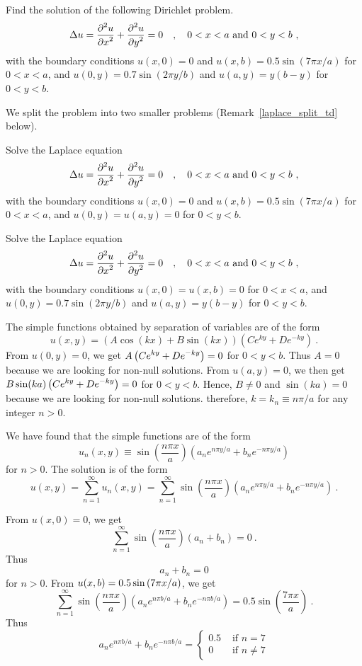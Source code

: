 \begin{egg}
Find the solution of the following Dirichlet problem.
\label{laplace_split_egg}
\[
\Delta u = \pdydxn{u}{x}{2} + \pdydxn{u}{y}{2} = 0
\quad , \quad 0 < x < a \ \text{and} \ 0 < y < b \ ,
\]
with the boundary conditions
$u(x,0) = 0$ and $u(x,b) = 0.5\sin\left(7\pi x/a\right)$ for
$0<x<a$, and $u(0,y) = 0.7 \sin\left(2\pi y/b\right)$ and
$u(a,y) = y(b-y)$ for $0<y<b$.

We split the problem into two smaller problems
(Remark~\ref{laplace_split_td} below).

Solve the Laplace equation
\[
\Delta u = \pdydxn{u}{x}{2} + \pdydxn{u}{y}{2} = 0
\quad , \quad 0 < x < a \ \text{and} \ 0 < y < b \ ,
\]
with the boundary conditions $u(x,0) = 0$ and
$u(x,b) = 0.5\sin\left(7\pi x/a\right)$ for $0<x<a$, and
$u(0,y) = u(a,y) = 0$ for $0<y<b$.

Solve the Laplace equation
\[
\Delta u = \pdydxn{u}{x}{2} + \pdydxn{u}{y}{2} = 0
\quad , \quad 0 < x < a \ \text{and} \ 0 < y < b \ ,
\]
with the boundary conditions $u(x,0) = u(x,b) = 0$ for $0<x<a$, and \\
$u(0,y) = 0.7 \sin\left(2\pi y/b\right)$ and
$u(a,y) = y(b-y)$ for $0<y<b$.

The simple functions obtained by separation of variables are of the
form
\[
u(x,y) = \left( A \cos(kx) + B\sin(kx) \right)
\left(C e^{ky} + D e^{-ky}\right) \ .
\]
From $u(0,y) = 0$, we get
$\displaystyle A\left(C e^{ky} + D e^{-ky}\right)=0$ for
$0<y<b$.  Thus $A=0$ because we are looking for non-null solutions.
From $u(a,y) = 0$, we then get
$\displaystyle B\sin(ka)\left(C e^{ky} + D e^{-ky}\right)=0$ for
$0<y<b$.  Hence, $B \neq 0$ and $\sin(ka)=0$ because we are looking for non-null
solutions.  therefore, $k = k_n \equiv n\pi/a$ for any integer $n>0$.

We have found that the simple functions are of the form
\[
u_n(x,y) \equiv \sin\left(\frac{n\pi x}{a}\right)
\left(a_n e^{n\pi y/a} + b_n e^{-n\pi y/a}\right)
\]
for $n > 0$.  The solution is of the form
\[
u(x,y) = \sum_{n=1}^\infty u_n(x,y) = 
\sum_{n=1}^\infty \sin\left(\frac{n\pi x}{a}\right)
\left(a_n e^{n\pi y/a} + b_n e^{-n\pi y/a}\right) \ .
\]

From $u(x,0) = 0$, we get
\[
\sum_{n=1}^\infty \sin\left(\frac{n\pi x}{a}\right)
\left(a_n + b_n \right) = 0 \ .
\]
Thus
\begin{equation} \label{laplace_spv_egg1a}
a_n + b_n = 0 
\end{equation}
for $n > 0$.
From $\displaystyle u(x,b) = 0.5\sin\left(7\pi x/a\right)$, we
get
\[
\sum_{n=1}^\infty \sin\left(\frac{n\pi x}{a}\right)
\left(a_n e^{n\pi b/a} + b_n e^{-n\pi b/a} \right) =
0.5\sin\left(\frac{7\pi x}{a}\right) \  .
\]
Thus
\begin{equation} \label{laplace_spv_egg1b}
a_n e^{n\pi b/a} + b_n e^{-n\pi b/a} = \begin{cases}
0.5 & \text{ if } n = 7 \\
0  & \text{ if } n\neq 7
\end{cases}
\end{equation}


\end{egg}
